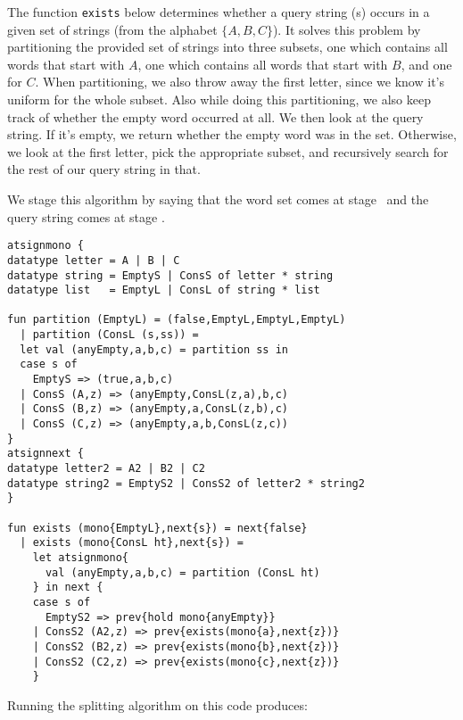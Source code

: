 The function {\tt exists} below determines whether a query string (s) occurs in a given set of strings (from the alphabet $\{A, B,C\}$).
It solves this problem by partitioning the provided set of strings into three subsets,
one which contains all words that start with $A$,
one which contains all words that start with $B$, and one for $C$.
When partitioning, we also throw away the first letter, since we know it's uniform for the whole subset.
Also while doing this partitioning, we also keep track of whether the empty word occurred at all.
We then look at the query string.  If it's empty, we return whether the empty word was in the set.
Otherwise, we look at the first letter, pick the appropriate subset, 
and recursively search for the rest of our query string in that.

We stage this algorithm by saying that the word set comes at stage \bbone\
and the query string comes at stage \bbtwo.

\begin{lstlisting} 
atsignmono { 
datatype letter = A | B | C 
datatype string = EmptyS | ConsS of letter * string
datatype list   = EmptyL | ConsL of string * list

fun partition (EmptyL) = (false,EmptyL,EmptyL,EmptyL) 
  | partition (ConsL (s,ss)) = 
  let val (anyEmpty,a,b,c) = partition ss in 
  case s of 
    EmptyS => (true,a,b,c) 
  | ConsS (A,z) => (anyEmpty,ConsL(z,a),b,c) 
  | ConsS (B,z) => (anyEmpty,a,ConsL(z,b),c) 
  | ConsS (C,z) => (anyEmpty,a,b,ConsL(z,c)) 
}
atsignnext { 
datatype letter2 = A2 | B2 | C2
datatype string2 = EmptyS2 | ConsS2 of letter2 * string2
}

fun exists (mono{EmptyL},next{s}) = next{false} 
  | exists (mono{ConsL ht},next{s}) = 
	let atsignmono{
	  val (anyEmpty,a,b,c) = partition (ConsL ht)
	} in next { 
	case s of 
	  EmptyS2 => prev{hold mono{anyEmpty}} 
	| ConsS2 (A2,z) => prev{exists(mono{a},next{z})} 
	| ConsS2 (B2,z) => prev{exists(mono{b},next{z})}
	| ConsS2 (C2,z) => prev{exists(mono{c},next{z})}  
	} 
\end{lstlisting}

\noindent
Running the splitting algorithm on this code produces:

